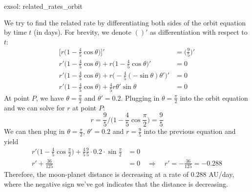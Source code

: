 \begin{exsol}[]{exsol: related_rates_orbit}

    We try to find the related rate by differentiating both sides of the orbit equation by time $t$ (in days).  For brevity, we denote $()'$ as differentiation with respect to $t$:
    \begin{align*}
        \Big[r\Big(1-\frac{4}{5}\cos \theta \Big)\Big]' &= \Big(\frac{9}{5}\Big)'\\
        r'\Big(1-\frac{4}{5}\cos \theta \Big) + r\Big(1-\frac{4}{5}\cos \theta \Big)'&= 0\\
        r'\Big(1-\frac{4}{5}\cos \theta \Big) + r\Big(-\frac{4}{5} (-\sin \theta) \theta')'&= 0\\
        r'\Big(1-\frac{4}{5}\cos \theta \Big) + \frac{4}{5} r \theta' \sin \theta &= 0
    \end{align*}
    At point $P$, we have $\theta = \frac{\pi}{2}$ and $\theta' = 0.2$.  Plugging in $\theta = \frac{\pi}{2}$ into the orbit equation and we can solve for $r$ at point $P$:
    \[r = \frac{9}{5}\Big/\Big(1-\frac{4}{5}\cos \frac{\pi}{2} \Big) = \frac{9}{5}\]
    We can then plug in $\theta = \frac{\pi}{2}$, $\theta' = 0.2$ and $r = \frac{9}{5}$ into the previous equation and yield
    \begin{align*}
        r'\Big(1-\frac{4}{5}\cos \frac{\pi}{2} \Big) + \frac{4}{5} \frac{9}{5} \cdot 0.2 \cdot \sin \frac{\pi}{2} &= 0\\
        r' + \frac{36}{125} &= 0 \quad \Rightarrow \quad r' = -\frac{36}{125} = -0.288
    \end{align*}
    Therefore, the moon-planet distance is decreasing at a rate of $0.288$ AU/day, where the negative sign we've got indicates that the distance is decreasing.
\end{exsol}

